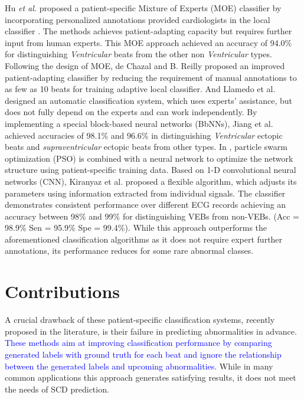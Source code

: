Hu \textit{et al.} proposed a patient-specific Mixture of Experts (MOE) classifier by incorporating personalized annotations provided cardiologists in the local classifier \cite{Hu_et_al}. The methods achieves patient-adapting capacity but requires further input from human experts. This MOE approach achieved an accuracy of 94.0\% for distinguishing \textit{Ventricular} beats from the other non \textit{Ventricular} types. Following the design of MOE, de Chazal and B. Reilly proposed an improved patient-adapting classifier by reducing the requirement of manual annotations to as few as 10 beats for training adaptive local classifier\cite{deChazal2006}. And Llamedo et al. designed an automatic classification system, which uses experts' assistance, but does not fully depend on the experts and can work independently\cite{llamedo2012automatic}. By implementing a special block-based neural networks (BbNNs), Jiang et al. achieved accuracies of 98.1\% and 96.6\% in distinguishing \textit{Ventricular} ectopic beats and \textit{supraventricular} ectopic beats from other types\cite{bbnn}. In \cite{ince2009generic}, particle swarm optimization (PSO) is combined with a neural network to optimize the network structure using patient-specific training data. Based on 1-D convolutional neural networks (CNN), Kiranyaz et al. proposed a flexible algorithm, which adjusts its parameters using information extracted from individual signals\cite{Kiranyaz}. The classifier demonstrates consistent performance over different ECG records achieving an accuracy between 98\% and 99\% for distinguishing VEBs from non-VEBs. (Acc = 98.9\%  Sen = 95.9\% Spe =  99.4\%). While this approach outperforms the aforementioned classification algorithms as it does not require expert further annotations, its performance reduces for some rare abnormal classes. 
 
\section{Contributions}

A crucial drawback of these patient-specific classification systems, recently proposed in the literature, is their failure in predicting abnormalities in advance. \textcolor{blue}{These methods aim at improving classification performance by comparing generated labels with ground truth for each beat and ignore the relationship between the generated labels and upcoming abnormalities. }%
While in many common applications this approach generates satisfying results, it does not meet the needs of SCD prediction. %

